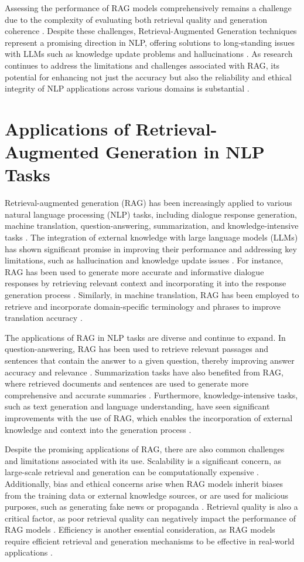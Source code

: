 \documentclass[conference]{IEEEtran}
\begin{document}
Assessing the performance of RAG models comprehensively remains a challenge due to the complexity of evaluating both retrieval quality and generation coherence \cite{b18}. Despite these challenges, Retrieval-Augmented Generation techniques represent a promising direction in NLP, offering solutions to long-standing issues with LLMs such as knowledge update problems and hallucinations \cite{b19}. As research continues to address the limitations and challenges associated with RAG, its potential for enhancing not just the accuracy but also the reliability and ethical integrity of NLP applications across various domains is substantial \cite{b20}.

\section{Applications of Retrieval-Augmented Generation in NLP Tasks}
Retrieval-augmented generation (RAG) has been increasingly applied to various natural language processing (NLP) tasks, including dialogue response generation, machine translation, question-answering, summarization, and knowledge-intensive tasks \cite{b1}. The integration of external knowledge with large language models (LLMs) has shown significant promise in improving their performance and addressing key limitations, such as hallucination and knowledge update issues \cite{b2}. For instance, RAG has been used to generate more accurate and informative dialogue responses by retrieving relevant context and incorporating it into the response generation process \cite{b3}. Similarly, in machine translation, RAG has been employed to retrieve and incorporate domain-specific terminology and phrases to improve translation accuracy \cite{b4}.

The applications of RAG in NLP tasks are diverse and continue to expand. In question-answering, RAG has been used to retrieve relevant passages and sentences that contain the answer to a given question, thereby improving answer accuracy and relevance \cite{b5}. Summarization tasks have also benefited from RAG, where retrieved documents and sentences are used to generate more comprehensive and accurate summaries \cite{b6}. Furthermore, knowledge-intensive tasks, such as text generation and language understanding, have seen significant improvements with the use of RAG, which enables the incorporation of external knowledge and context into the generation process \cite{b7}.

Despite the promising applications of RAG, there are also common challenges and limitations associated with its use. Scalability is a significant concern, as large-scale retrieval and generation can be computationally expensive \cite{b8}. Additionally, bias and ethical concerns arise when RAG models inherit biases from the training data or external knowledge sources, or are used for malicious purposes, such as generating fake news or propaganda \cite{b9}. Retrieval quality is also a critical factor, as poor retrieval quality can negatively impact the performance of RAG models \cite{b10}. Efficiency is another essential consideration, as RAG models require efficient retrieval and generation mechanisms to be effective in real-world applications \cite{b11}.
\end{document}
